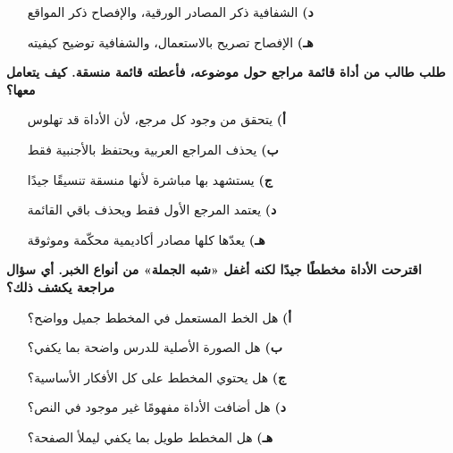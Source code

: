 \documentclass[11pt,a4paper]{article}
\begin{document}
\begin{multicols}{2}
\begin{minipage}{\linewidth}
\begin{itemize}[leftmargin=0.95cm, labelsep=4pt, itemsep=0pt, topsep=2pt, parsep=0pt]
  \item[\textbf{د)}] الشفافية ذكر المصادر الورقية، والإفصاح ذكر المواقع
  \item[\textbf{هـ)}] الإفصاح تصريح بالاستعمال، والشفافية توضيح كيفيته
\end{itemize}
\end{minipage}\par\vspace{7pt plus 4pt}
\noindent\begin{minipage}{\linewidth}
\hangindent=0.7cm\textbf{طلب طالب من أداة قائمة مراجع حول موضوعه، فأعطته قائمة منسقة. كيف يتعامل معها؟}
\begin{itemize}[leftmargin=0.95cm, labelsep=4pt, itemsep=0pt, topsep=2pt, parsep=0pt]
  \item[\textbf{أ)}] يتحقق من وجود كل مرجع، لأن الأداة قد تهلوس
  \item[\textbf{ب)}] يحذف المراجع العربية ويحتفظ بالأجنبية فقط
  \item[\textbf{ج)}] يستشهد بها مباشرة لأنها منسقة تنسيقًا جيدًا
  \item[\textbf{د)}] يعتمد المرجع الأول فقط ويحذف باقي القائمة
  \item[\textbf{هـ)}] يعدّها كلها مصادر أكاديمية محكّمة وموثوقة
\end{itemize}
\end{minipage}\par\vspace{7pt plus 4pt}
\noindent\begin{minipage}{\linewidth}
\hangindent=0.7cm\textbf{اقترحت الأداة مخططًا جيدًا لكنه أغفل «شبه الجملة» من أنواع الخبر. أي سؤال مراجعة يكشف ذلك؟}
\begin{itemize}[leftmargin=0.95cm, labelsep=4pt, itemsep=0pt, topsep=2pt, parsep=0pt]
  \item[\textbf{أ)}] هل الخط المستعمل في المخطط جميل وواضح؟
  \item[\textbf{ب)}] هل الصورة الأصلية للدرس واضحة بما يكفي؟
  \item[\textbf{ج)}] هل يحتوي المخطط على كل الأفكار الأساسية؟
  \item[\textbf{د)}] هل أضافت الأداة مفهومًا غير موجود في النص؟
  \item[\textbf{هـ)}] هل المخطط طويل بما يكفي ليملأ الصفحة؟
\end{itemize}
\end{minipage}\par\vspace{7pt plus 4pt}
\end{multicols}
\end{document}

